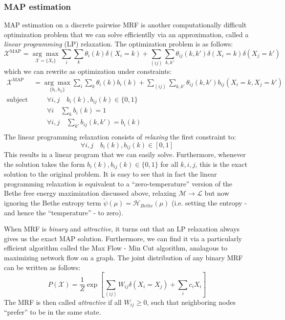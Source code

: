 \documentclass[a4paper]{article}
\begin{document}
\subsubsection{MAP estimation}
MAP estimation on a discrete pairwise MRF is another computationally difficult optimization problem that we can solve efficientlly via an approximation, called a \emph{linear programming} (LP) relaxation. The optimization problem is as follows:
\[ \mathcal{X}^\textrm{MAP} = \underset{\mathcal{X} = \{X_i\}}{\arg\max} \sum_i\sum_k \theta_i(k)\delta(X_i = k) + \sum_{(ij)}\sum_{k,k'} \theta_{ij}(k,k') \delta(X_i = k)\delta(X_j = k') \]
which we can rewrite as optimization under constraints:
\begin{align*}
\mathcal{X}^\textrm{MAP} &= \underset{\{b_i,b_{ij}\}}{\arg\max} \sum_i\sum_k \theta_i(k)b_i(k) + \sum_{(ij)}\sum_{k,k'} \theta_{ij}(k,k') b_{ij}(X_i = k,X_j = k') \\
\text{subject to}& \quad\quad \forall i,j \quad b_i(k),b_{ij}(k) \in \{0,1\} \\
& \quad\quad \forall i \quad \sum_{k} b_i(k) = 1 \\
& \quad\quad \forall i,j \quad \sum_{k'} b_{ij}(k,k') = b_i(k) \\
\end{align*}
The linear programming relaxation consists of \emph{relaxing} the first constraint to:
\[ \forall i,j \quad b_i(k),b_{ij}(k) \in [0,1] \]
This results in a linear program that we can easily solve. Furthermore, whenever the solution takes the form $b_i(k),b_{ij}(k) \in \{0,1\}$ for all $k,i,j$, this is the exact solution to the original problem. It is easy to see that in fact the linear programming relaxation is equivalent to a ``zero-temperature'' version of the Bethe free energy maximization discussed above, relaxing $\mathcal{M} \rightarrow \mathcal{L}$ but now ignoring the Bethe entropy term $\tilde{\psi}(\mu) = \mathcal{H}_{Bethe}(\mu)$ (i.e. setting the entropy - and hence the ``temperature'' - to zero).

When MRF is \emph{binary} and \emph{attractive}, it turns out that an LP relaxation always gives us the exact MAP solution. Furthermore, we can find it via a particularly efficient algorithm called the Max Flow - Min Cut algorithm, analagous to maximizing network flow on a graph. The joint distribution of any binary MRF can be written as follows:
\[ P(\mathcal{X}) = \frac{1}{Z} \exp\left[\sum_{(ij)} W_{ij}\delta(X_i = X_j) + \sum_i c_iX_i \right] \]
The MRF is then called \emph{attractive} if all $W_{ij} \geq 0$, such that neighboring nodes ``prefer'' to be in the same state. 
\end{document}
